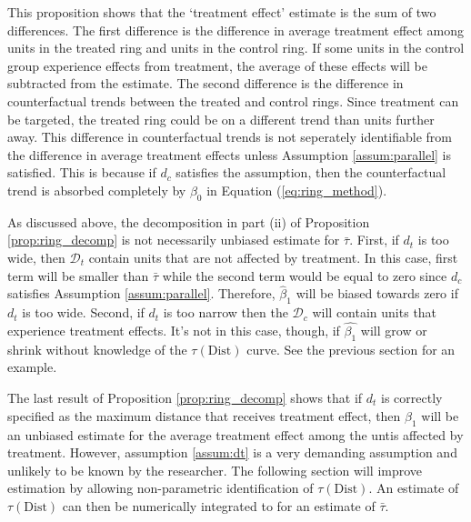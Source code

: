 \documentclass[10pt]{article}
\newcommand{\dist}{\text{Dist}}
\begin{document}
This proposition shows that the `treatment effect' estimate is the sum of two differences. The first difference is the difference in average treatment effect among units in the treated ring and units in the control ring. If some units in the control group experience effects from treatment, the average of these effects will be subtracted from the estimate. The second difference is the difference in counterfactual trends between the treated and control rings. Since treatment can be targeted, the treated ring could be on a different trend than units further away. This difference in counterfactual trends is not seperately identifiable from the difference in average treatment effects unless Assumption \ref{assum:parallel} is satisfied. This is because if $d_c$ satisfies the assumption, then the counterfactual trend is absorbed completely by $\beta_0$ in Equation (\ref{eq:ring_method}).

As discussed above, the decomposition in part (ii) of Proposition \ref{prop:ring_decomp} is not necessarily unbiased estimate for $\bar{\tau}$. First, if $d_t$ is too wide, then $\mathcal{D}_t$ contain units that are not affected by treatment. In this case, first term will be smaller than $\bar{\tau}$ while the second term would be equal to zero since $d_c$ satisfies Assumption \ref{assum:parallel}. Therefore, $\hat{\beta}_1$ will be biased towards zero if $d_t$ is too wide. Second, if $d_t$ is too narrow then the $\mathcal{D}_c$ will contain units that experience treatment effects. It's not in this case, though, if $\hat{\beta_1}$ will grow or shrink without knowledge of the $\tau(\dist)$ curve. See the previous section for an example. 

The last result of Proposition \ref{prop:ring_decomp} shows that if $d_t$ is correctly specified as the maximum distance that receives treatment effect, then $\hat{\beta}_1$ will be an unbiased estimate for the average treatment effect among the untis affected by treatment. However, assumption \ref{assum:dt} is a very demanding assumption and unlikely to be known by the researcher. The following section will improve estimation by allowing non-parametric identification of $\tau(\dist)$. An estimate of $\tau(\dist)$ can then be numerically integrated to for an estimate of $\bar{\tau}$.










\newpage~
\end{document}

